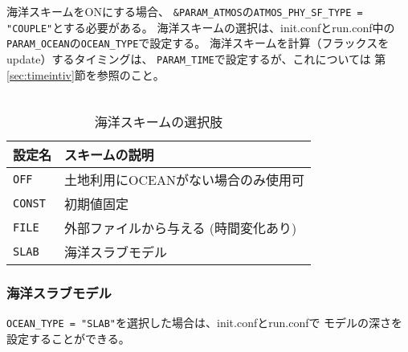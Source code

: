 海洋スキームをONにする場合、
\verb|&PARAM_ATMOS|の\verb|ATMOS_PHY_SF_TYPE = "COUPLE"|とする必要がある。
海洋スキームの選択は、init.confとrun.conf中の
\verb|PARAM_OCEAN|の\verb|OCEAN_TYPE|で設定する。
海洋スキームを計算（フラックスをupdate）するタイミングは、
\verb|PARAM_TIME|で設定するが、これについては
第\ref{sec:timeintiv}節を参照のこと。\\

\\

\begin{table}[h]
\begin{center}
  \caption{海洋スキームの選択肢}
  \label{tab:nml_ocean}
  \begin{tabularx}{150mm}{lX} \hline
    \rowcolor[gray]{0.9}  設定名 & スキームの説明 \\ \hline
      \verb|OFF|   & 土地利用にOCEANがない場合のみ使用可    \\
      \verb|CONST| & 初期値固定                              \\
      \verb|FILE|  & 外部ファイルから与える (時間変化あり)   \\
      \verb|SLAB|  & 海洋スラブモデル                        \\
    \hline
  \end{tabularx}
\end{center}
\end{table}


\subsubsection{海洋スラブモデル}
\verb|OCEAN_TYPE = "SLAB"|を選択した場合は、init.confとrun.confで
モデルの深さを設定することができる。\\

\\


